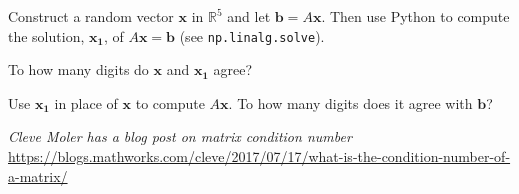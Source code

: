 \documentclass[12pt,letterpaper,noanswers]{exam}
\newcommand{\vc}[1]{\boldsymbol{#1}}
\begin{document}
\begin{questions}
\begin{parts}
\item Construct a random vector $\vc{x}$ in $\mathbb{R}^5$ and let $\vc{b} = A\vc{x}$.  Then use Python to compute the solution, $\vc{x_1}$, of $A\vc{x} = \vc{b}$ (see \texttt{np.linalg.solve}).

To how many digits do $\vc{x}$ and $\vc{x_1}$ agree?


\item Use $\vc{x_1}$ in place of $\vc{x}$ to compute $A\vc{x}$.  To how many digits does it agree with $\vc{b}$?


\end{parts}





\emph{Cleve Moler has a blog post on matrix condition number} \url{https://blogs.mathworks.com/cleve/2017/07/17/what-is-the-condition-number-of-a-matrix/}
\end{questions}



% 
% 
\end{document}
